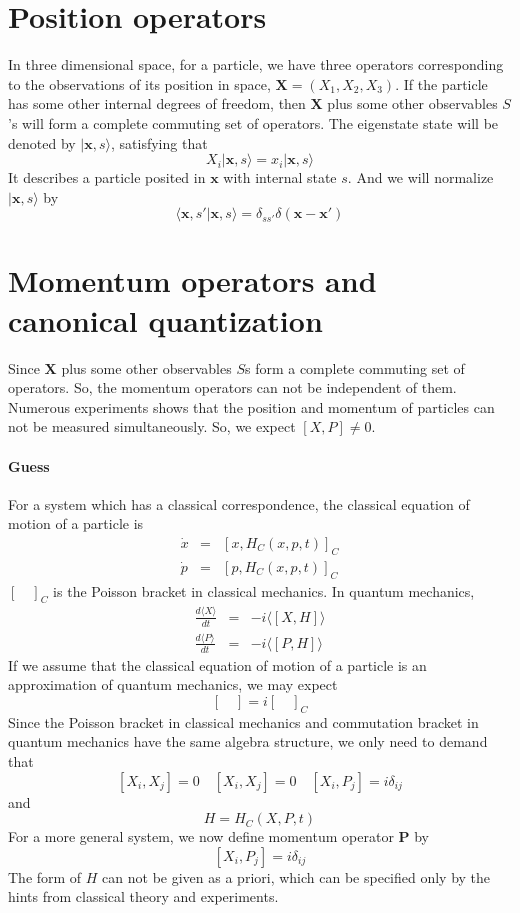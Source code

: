 \section{Position operators}
\noindent
In three dimensional space, for a particle, we have three operators corresponding to the observations of its position in space, $\bm{X} = (X_1, X_2, X_3)$. If the particle has some other internal degrees of freedom, then $\bm{X}$ plus some other observables $S$'s will form  a complete commuting set of operators. The eigenstate state will be denoted by $| \bm{x},s \rangle$, satisfying that
\[X_i | \bm{x},s \rangle = x_i | \bm{x},s \rangle  \]
It describes a particle posited in $\bm{x}$ with internal state $s$. And we will normalize $| \bm{x},s \rangle $ by 
\[\langle \bm{x},s'| \bm{x},s \rangle = \delta_{ss'}\delta(\bm{x}-\bm{x}')\]

\section{Momentum operators and canonical quantization}
\noindent
Since $\bm{X}$ plus some other observables $S$s form a complete commuting set of operators. So, the momentum operators can not be independent of them. Numerous experiments shows that the position and momentum of particles can not be measured simultaneously. So, we expect $[X,P] \neq 0$.
\paragraph{Guess} 
For a system which has a classical correspondence, the classical equation of motion of a particle is
\begin{eqnarray}
\dot{x} &=& [x,H_C(x,p,t)]_C \nonumber \\
\dot{p} &=& [p,H_C(x,p,t)]_C \nonumber
\end{eqnarray}
$[\quad]_C$ is the Poisson bracket in classical mechanics. In quantum mechanics,
\begin{eqnarray}
\frac{d\langle X \rangle}{dt} &=& -i \langle [X,H] \rangle \nonumber \\
\frac{d\langle P \rangle}{dt} &=& -i \langle [P,H] \rangle \nonumber
\end{eqnarray}
If we assume that the classical equation of motion of a particle is an approximation of quantum mechanics, we may expect
\[[\quad] = i [\quad]_C \]
Since the Poisson bracket in classical mechanics and commutation bracket in quantum mechanics have the same algebra structure, we only need to demand that
\[[X_i,X_j] = 0 \quad [X_i,X_j] = 0 \quad [X_i,P_j] = i \delta_{ij}\]
and
\[H = H_C(X,P,t)\]
For a more general system, we now define momentum operator $\bm{P}$ by 
\[[X_i,P_j] = i \delta_{ij}\]
The form of $H$ can not be given as a priori, which can be specified only by the hints from classical theory and experiments.

